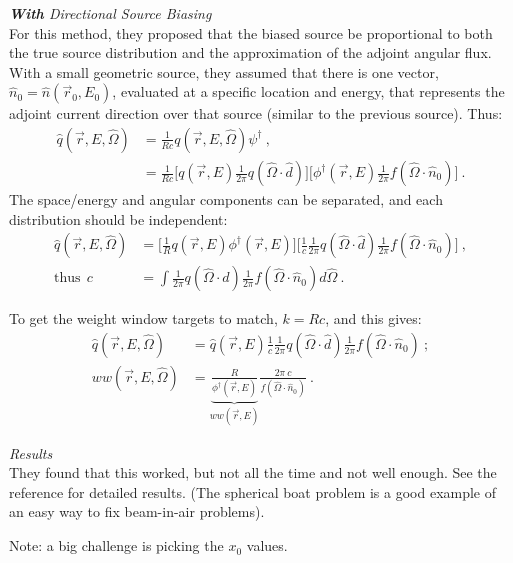 \documentclass[12pt,twoside]{article}
\newcommand{\vOmega}{\ensuremath{\hat{\Omega}}}
\begin{document}
\vspace*{1em}
\noindent \textit{\textbf{With} Directional Source Biasing}\\
For this method, they proposed that the biased source be proportional to both the true source distribution and the approximation of the adjoint angular flux. With a small geometric source, they assumed that there is one vector, $\hat{n}_0 = \hat{n}(\vec{r}_0, E_0)$, evaluated at a specific location and energy, that represents the adjoint current direction over that source (similar to the previous source). Thus:
\begin{align}
  \hat{q}(\vec{r}, E, \vOmega) &= \frac{1}{Rc} q(\vec{r}, E, \vOmega)\psi^{\dagger}\:, \\
   &= \frac{1}{Rc} \bigl[q(\vec{r}, E) \frac{1}{2 \pi} q(\vOmega \cdot \hat{d})\bigr] \bigl[\phi^{\dagger}(\vec{r}, E)\frac{1}{2 \pi} f(\vOmega \cdot \hat{n}_0)\bigr]  \:.
\end{align}
The space/energy and angular components can be separated, and each distribution should be independent:
\begin{align}
  \hat{q}(\vec{r}, E, \vOmega) &= \bigl[\frac{1}{R} q(\vec{r}, E) \phi^{\dagger}(\vec{r}, E)\bigr] \bigl[\frac{1}{c}\frac{1}{2 \pi} q(\vOmega \cdot \hat{d})\frac{1}{2 \pi} f(\vOmega \cdot \hat{n}_0)\bigr] \:,  \\
 \text{thus} \: \: c &= \int \frac{1}{2 \pi} q(\vOmega \cdot \hat{d})\frac{1}{2 \pi} f(\vOmega \cdot \hat{n}_0) d\vOmega \:.
\end{align}

To get the weight window targets to match, $k = Rc$, and this gives:
\begin{align}
  \hat{q}(\vec{r}, E, \vOmega) &= \hat{q} (\vec{r}, E) \frac{1}{c}\frac{1}{2 \pi} q(\vOmega \cdot \hat{d})\frac{1}{2 \pi} f(\vOmega \cdot \hat{n}_0) \:; \\
  ww(\vec{r}, E, \vOmega) &= \underbrace{\frac{R}{\phi^{\dagger}(\vec{r}, E)}}_{ww(\vec{r},E)} \frac{2 \pi \:c}{f(\vOmega \cdot \hat{n}_0)} \:.
\end{align}

\vspace*{1em}
\noindent \textit{Results}\\
They found that this worked, but not all the time and not well enough. See the reference for detailed results. (The spherical boat problem is a good example of an easy way to fix beam-in-air problems). 

Note: a big challenge is picking the $x_0$ values.
\end{document}
